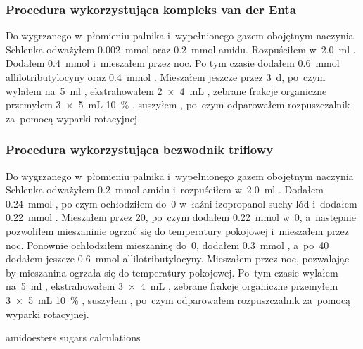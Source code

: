 \subsubsection{Procedura wykorzystująca kompleks van der Enta}\label{experimental:activation:van-der-ent}
Do wygrzanego w~płomieniu palnika i~wypełnionego gazem obojętnym naczynia Schlenka odważyłem
  \SI{0.002}{\mmol}  oraz \SI{0.2}{\mmol} amidu.
Rozpuściłem w~\SI{2.0}{\ml} .
Dodałem \SI{0.4}{\mmol}  i~mieszałem przez noc.
Po tym czasie dodałem \SI{0.6}{\mmol} allilotributylocyny oraz \SI{0.4}{\mmol} .
Mieszałem jeszcze przez \SI{3}{\day}, po~czym wylałem na~\SI{5}{\ml} ,
  ekstrahowałem \SI[product-units = single]{2 x 4}{\mL} , zebrane frakcje organiczne
  przemyłem \SI[product-units = single]{3 x 5}{\mL} \SI{10}{\percent} ,
  suszyłem , po~czym odparowałem rozpuszczalnik za~pomocą wyparki rotacyjnej.

\subsubsection{Procedura wykorzystująca bezwodnik triflowy}\label{experimental:activation:triflic}
Do wygrzanego w~płomieniu palnika i~wypełnionego gazem obojętnym naczynia Schlenka odważyłem
  \SI{0.2}{\mmol} amidu i~rozpuściłem w~\SI{2.0}{\ml} .
Dodałem \SI{0.24}{\mmol} , po czym ochłodziłem do~\SI{0}{\degC}
  w~łaźni izopropanol-suchy lód i~dodałem \SI{0.22}{\mmol} .
Mieszałem przez \SI{20}{\min}, po~czym dodałem \SI{0.22}{\mmol}  w~\SI{0}{\degC},
  a~następnie pozwoliłem mieszaninie ogrzać się do temperatury pokojowej i~mieszałem przez noc.
Ponownie ochłodziłem mieszaninę do~\SI{0}{\degC}, dodałem \SI{0.3}{\mmol} ,
  a~po~\SI{40}{\min} dodałem jeszcze \SI{0.6}{\mmol} allilotributylocyny.
Mieszałem przez noc, pozwalając by mieszanina ogrzała się do temperatury pokojowej.
Po~tym czasie wylałem na~\SI{5}{\ml} ,
  ekstrahowałem \SI[product-units = single]{3 x 4}{\mL} , zebrane frakcje organiczne
  przemyłem \SI[product-units = single]{3 x 5}{\mL} \SI{10}{\percent} ,
  suszyłem , po~czym odparowałem rozpuszczalnik za~pomocą wyparki rotacyjnej.

{amidoesters}
{sugars}
{calculations}
